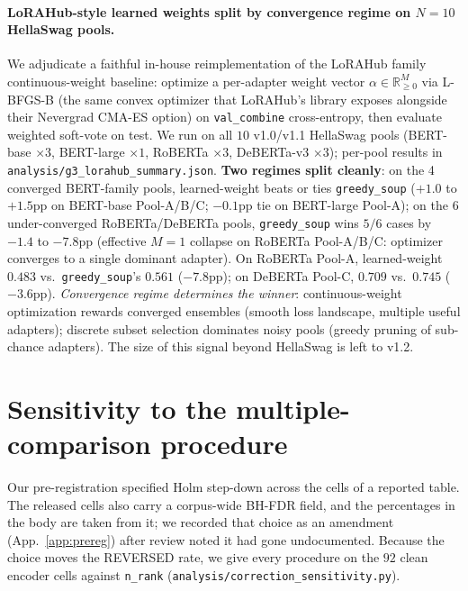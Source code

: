 \documentclass[11pt]{article}
\begin{document}
\paragraph{LoRAHub-style learned weights split by convergence regime on $N{=}10$ HellaSwag pools.} We adjudicate a faithful in-house reimplementation of the LoRAHub family \citep{huang2023lorahub} continuous-weight baseline: optimize a per-adapter weight vector $\alpha\!\in\!\mathbb{R}_{\geq 0}^M$ via L-BFGS-B (the same convex optimizer that LoRAHub's library exposes alongside their Nevergrad CMA-ES option) on \texttt{val\_combine} cross-entropy, then evaluate weighted soft-vote on test. We run on all $10$ v1.0/v1.1 HellaSwag pools (BERT-base $\times 3$, BERT-large $\times 1$, RoBERTa $\times 3$, DeBERTa-v3 $\times 3$); per-pool results in \texttt{analysis/\allowbreak g3\_\allowbreak lorahub\_\allowbreak summary.\allowbreak json}. \textbf{Two regimes split cleanly}: on the 4 converged BERT-family pools, learned-weight beats or ties \texttt{greedy\_soup} ($+1.0$ to $+1.5$pp on BERT-base Pool-A/B/C; $-0.1$pp tie on BERT-large Pool-A); on the 6 under-converged RoBERTa/DeBERTa pools, \texttt{greedy\_soup} wins $5/6$ cases by $-1.4$ to $-7.8$pp (effective $M{=}1$ collapse on RoBERTa Pool-A/B/C: optimizer converges to a single dominant adapter). On RoBERTa Pool-A, learned-weight $0.483$ vs.\ \texttt{greedy\_soup}'s $\mathbf{0.561}$ ($-7.8$pp); on DeBERTa Pool-C, $0.709$ vs.\ $\mathbf{0.745}$ ($-3.6$pp). \emph{Convergence regime determines the winner}: continuous-weight optimization rewards converged ensembles (smooth loss landscape, multiple useful adapters); discrete subset selection dominates noisy pools (greedy pruning of sub-chance adapters). The size of this signal beyond HellaSwag is left to v1.2.


\section{Sensitivity to the multiple-comparison procedure}\label{app:correction}
Our pre-registration specified Holm step-down across the cells of a reported table. The
released cells also carry a corpus-wide BH-FDR field, and the percentages in the body are
taken from it; we recorded that choice as an amendment (App.~\ref{app:prereg}) after review
noted it had gone undocumented. Because the choice moves the REVERSED rate, we give every
procedure on the $92$ clean encoder cells against \texttt{n\_rank}
(\texttt{analysis/\allowbreak correction\_\allowbreak sensitivity.\allowbreak py}).
\end{document}
